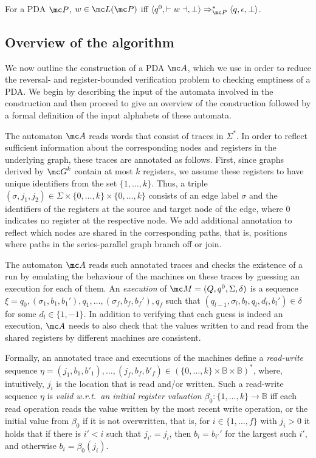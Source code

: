 For a PDA $\mc P$, $w \in \mc L(\mc P)$ iff $\langle q^0,\vdash w \dashv,\bot\rangle \Rightarrow_{\mc P}^* \langle q,\epsilon,\bot \rangle$.


\subsection{Overview of the algorithm}
We now outline the construction of a PDA $\mc A$, which we use in order to reduce the reversal- and register-bounded verification problem to checking emptiness of a PDA. We begin by describing the input of the  automata involved in the construction and then proceed to give an overview of the construction followed by a  
formal definition of the input alphabets of these automata.

The automaton $\mc A$ reads words that consist of traces in $\Sigma^*$. 
In order to reflect sufficient information about the corresponding nodes and
registers in the underlying graph, these traces are annotated as follows. 
First, since graphs derived by ${\mc G}^k$ contain at most $k$ registers,
we assume these registers to have unique identifiers from the set $\{1,\ldots,k\}$.
Thus, a triple $(\sigma,j_1,j_2) \in \Sigma\times\{0,\ldots,k\}\times\{0,\ldots,k\}$ 
consists of an edge label $\sigma$ and the identifiers of the registers at the source and target node 
of the edge, where $0$ indicates no register at the respective node.
We add additional annotation to reflect which nodes are shared in the corresponding
paths, that is, positions where paths in the series-parallel graph branch off or join. 

The automaton $\mc A$ reads such annotated traces and checks the existence of a run
by emulating the behaviour of the machines on these traces by guessing an execution
for each of them. 
An \emph{execution} of $\mc M = (Q,q^0,\Sigma,\delta)$ is a sequence  
$\xi = q_0,(\sigma_1,b_1,b_1'),q_1,\ldots,(\sigma_f,b_f,b_f'),q_f$ 
such that $(q_{l-1},\sigma_l,b_l,q_l,d_l,b_l') \in \delta$
for some $d_l \in \{1,-1\}$.
In addition to verifying that each guess is indeed an execution,
$\mc A$ needs to also check that the values written to and read from
the shared registers by different machines are consistent. 

Formally, an annotated trace and executions of the machines  define a
\emph{read-write} sequence $\eta = (j_1,b_1,b'_1),\ldots,(j_f,b_f,b'_f) \in 
(\{0,\ldots,k\} \times \mathbb{B} \times \mathbb{B})^*$, 
where, intuitively, $j_i$ is the location that is read and/or written.
Such a read-write sequence $\eta$ is \emph{valid w.r.t.\ an initial register valuation 
$\beta_0 : \{1,\ldots,k\} \to \mathbb{B}$} iff each read operation reads the value
written by the most recent write operation, or the initial value from $\beta_0$ if it is not overwritten,
that is, for $i \in \{1,\ldots,f\}$ with $j_i > 0$ it holds that 
if there is $i' < i$ such that $j_{i'} =  j_i$, then $b_i = b_{i'}'$
for the largest such $i'$, and otherwise $b_i = \beta_0(j_i)$.

